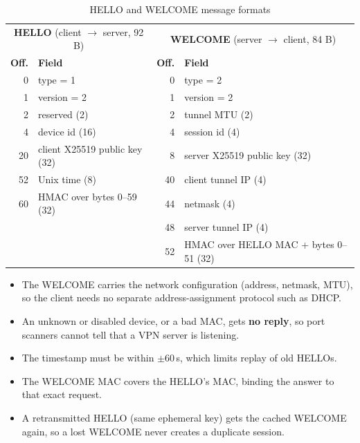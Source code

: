\documentclass[12pt,a4paper]{report}
\begin{document}
\begin{table}[H]
\centering
\caption{HELLO and WELCOME message formats}
\begin{tabular}{@{}rlrl@{}}
\toprule
\multicolumn{2}{c}{\textbf{HELLO} (client $\to$ server, 92 B)} & \multicolumn{2}{c}{\textbf{WELCOME} (server $\to$ client, 84 B)}\\
\textbf{Off.} & \textbf{Field} & \textbf{Off.} & \textbf{Field}\\
\midrule
0 & type = 1 & 0 & type = 2\\
1 & version = 2 & 1 & version = 2\\
2 & reserved (2) & 2 & tunnel MTU (2)\\
4 & device id (16) & 4 & session id (4)\\
20 & client X25519 public key (32) & 8 & server X25519 public key (32)\\
52 & Unix time (8) & 40 & client tunnel IP (4)\\
60 & HMAC over bytes 0--59 (32) & 44 & netmask (4)\\
 & & 48 & server tunnel IP (4)\\
 & & 52 & HMAC over HELLO MAC + bytes 0--51 (32)\\
\bottomrule
\end{tabular}
\end{table}

\begin{itemize}
  \item The WELCOME carries the network configuration (address, netmask, MTU), so the
        client needs no separate address-assignment protocol such as DHCP.
  \item An unknown or disabled device, or a bad MAC, gets \textbf{no reply}, so port
        scanners cannot tell that a VPN server is listening.
  \item The timestamp must be within $\pm60$\,s, which limits replay of old HELLOs.
  \item The WELCOME MAC covers the HELLO's MAC, binding the answer to that exact request.
  \item A retransmitted HELLO (same ephemeral key) gets the cached WELCOME again, so a
        lost WELCOME never creates a duplicate session.
\end{itemize}
\end{document}
